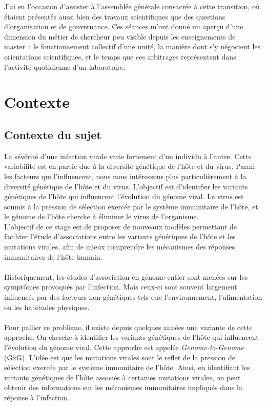 \documentclass[11pt,a4paper]{article}
\begin{document}
J'ai eu l'occasion d'assister à l'assemblée générale consacrée à cette transition, où
étaient présentés aussi bien des travaux scientifiques que des questions d'organisation et de
gouvernance. Ces séances m'ont donné un aperçu d'une dimension du métier de chercheur peu visible
depuis les enseignements de master~: le fonctionnement collectif d'une unité, la manière dont s'y
négocient les orientations scientifiques, et le temps que ces arbitrages représentent dans
l'activité quotidienne d'un laboratoire.



\newpage
\section{Contexte}
\vspace{1.5cm}
\subsection{Contexte du sujet}
La sévérité d'une infection virale varie fortement d'un individu à l'autre.
Cette variabilité est en partie due à la diversité génétique de l'hôte et du virus.
Parmi les facteurs qui l'influencent, nous nous intéressons plus particulièrement à la diversité génétique de l'hôte et du virus. L'objectif est d'identifier les variants génétiques de l'hôte qui influencent l'évolution du génome viral.
Le virus est soumis à la pression de sélection exercée par le système immunitaire de l'hôte, et le génome de l'hôte cherche à éliminer le virus de l'organisme.
\\
L'objectif de ce stage est de proposer de nouveaux modèles permettant de faciliter l'étude d'associations entre les variants génétiques de l'hôte et les mutations virales, afin de mieux comprendre les mécanismes des réponses immunitaires de l'hôte humain.
\\
\\
Historiquement, les études d'association en génome entier sont menées sur les symptômes provoqués par l'infection. Mais ceux-ci sont souvent largement influencés par des facteurs non génétiques tels que l'environnement, l'alimentation ou les habitudes physiques.
\\
\\
Pour pallier ce problème, il existe depuis quelques années une variante de cette approche. On cherche à identifier les variants génétiques de l'hôte qui influencent l'évolution du génome viral. Cette approche est appelée \textit{Genome-to-Genome} (GxG).
L'idée est que les mutations virales sont le reflet de la pression de sélection exercée par le système immunitaire de l'hôte. Ainsi, en identifiant les variants génétiques de l'hôte associés à certaines mutations virales, on peut obtenir des informations sur les mécanismes immunitaires impliqués dans la réponse à l'infection.
\end{document}
